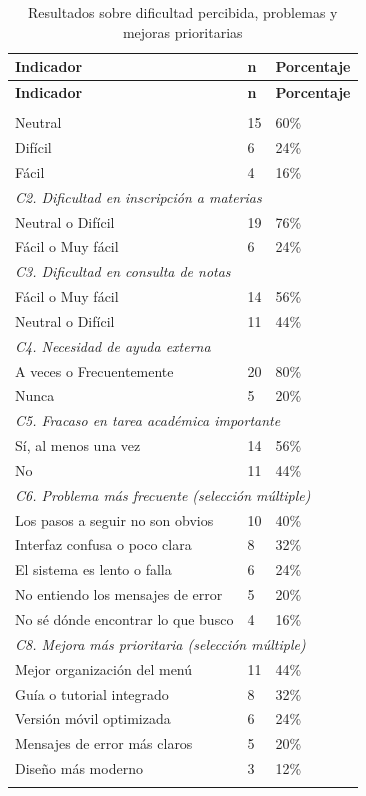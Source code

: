 \begin{longtable}{|p{7.5cm}|p{2cm}|p{2.5cm}|}
\hline
\textbf{Indicador} & \textbf{n} & \textbf{Porcentaje} \\
\hline
\endfirsthead
\hline
\textbf{Indicador} & \textbf{n} & \textbf{Porcentaje} \\
\hline
\endhead
\hline
\endfoot
\endlastfoot
 
\multicolumn{3}{|l|}{\textit{C1. Dificultad general percibida}} \\
\hline
Neutral          & 15 & 60\% \\
Difícil          & 6  & 24\% \\
Fácil            & 4  & 16\% \\
\hline
\multicolumn{3}{|l|}{\textit{C2. Dificultad en inscripción a materias}} \\
\hline
Neutral o Difícil    & 19 & 76\% \\
Fácil o Muy fácil    & 6  & 24\% \\
\hline
\multicolumn{3}{|l|}{\textit{C3. Dificultad en consulta de notas}} \\
\hline
Fácil o Muy fácil    & 14 & 56\% \\
Neutral o Difícil    & 11 & 44\% \\
\hline
\multicolumn{3}{|l|}{\textit{C4. Necesidad de ayuda externa}} \\
\hline
A veces o Frecuentemente & 20 & 80\% \\
Nunca                    & 5  & 20\% \\
\hline
\multicolumn{3}{|l|}{\textit{C5. Fracaso en tarea académica importante}} \\
\hline
Sí, al menos una vez & 14 & 56\% \\
No                   & 11 & 44\% \\
\hline
\multicolumn{3}{|l|}{\textit{C6. Problema más frecuente (selección múltiple)}} \\
\hline
Los pasos a seguir no son obvios   & 10 & 40\% \\
Interfaz confusa o poco clara      & 8  & 32\% \\
El sistema es lento o falla        & 6  & 24\% \\
No entiendo los mensajes de error  & 5  & 20\% \\
No sé dónde encontrar lo que busco & 4  & 16\% \\
\hline
\multicolumn{3}{|l|}{\textit{C8. Mejora más prioritaria (selección múltiple)}} \\
\hline
Mejor organización del menú      & 11 & 44\% \\
Guía o tutorial integrado        & 8  & 32\% \\
Versión móvil optimizada         & 6  & 24\% \\
Mensajes de error más claros     & 5  & 20\% \\
Diseño más moderno               & 3  & 12\% \\
\hline
\caption{Resultados sobre dificultad percibida, problemas y mejoras prioritarias}\label{tab:dificultad-problemas}
\end{longtable}


